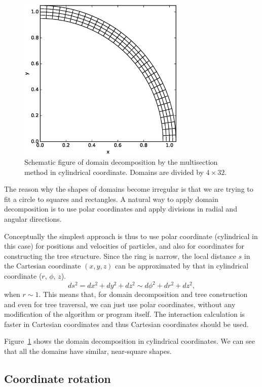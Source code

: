 \documentclass[oribibl]{llncs}
\begin{document}
\begin{figure}
  \centering
    \includegraphics[width=8cm,clip]{./fig/domain_cyl.eps}
  \caption{Schematic figure of domain decomposition by the multisection
    method in cylindrical coordinate. Domains are divided by $4 \times 32$.}
  \label{fig:domain_cyl}
\end{figure}

The reason why the shapes of domains become irregular is that we are
trying to fit a circle to squares and rectangles. A natural way to
apply domain decomposition is to use polar coordinates and apply
divisions in radial and angular directions.

Conceptually the simplest approach is thus to use polar coordinate
(cylindrical in this case) for positions and velocities of particles,
and also for coordinates for constructing the tree structure. Since
the ring is narrow, the local distance $s$ in the Cartesian coordinate
$(x, y, z)$ can be approximated by that in cylindrical coordinate
($r$, $\phi$, $z$).
\begin{equation}
  \label{eq:metric}
  ds^2 = dx^2 + dy^2 + dz^2 \sim d\phi ^2 + dr^2 + dz^2,
\end{equation}
when $r \sim 1$. This means that, for domain decomposition and tree
construction and even for tree traversal, we can just use polar
coordinates, without any modification of the algorithm or program
itself. The interaction calculation is faster in Cartesian
coordinates and thus Cartesian coordinates should be used.

Figure~\ref{fig:domain_cyl} shows the domain decomposition in
cylindrical coordinates. We can see that all the domains have similar,
near-square shapes.

\subsection{Coordinate rotation}
\label{subsec:exptcl}
 
\end{document}
